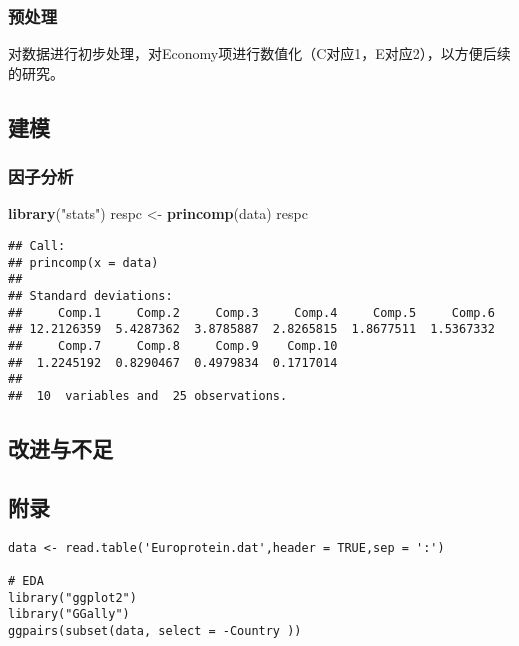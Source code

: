 \documentclass[]{article}
\newenvironment{Shaded}{\begin{snugshade}}{\end{snugshade}}
\newcommand{\KeywordTok}[1]{\textcolor[rgb]{0.13,0.29,0.53}{\textbf{#1}}}
\newcommand{\NormalTok}[1]{#1}
\newcommand{\StringTok}[1]{\textcolor[rgb]{0.31,0.60,0.02}{#1}}
\begin{document}
\subsubsection{预处理}

对数据进行初步处理，对Economy项进行数值化（C对应1，E对应2），以方便后续的研究。

\subsection{建模}

\subsubsection{因子分析}

\begin{Shaded}
\begin{Highlighting}[]
\KeywordTok{library}\NormalTok{(}\StringTok{"stats"}\NormalTok{)}
\NormalTok{respc <-}\StringTok{ }\KeywordTok{princomp}\NormalTok{(data)}
\NormalTok{respc}
\end{Highlighting}
\end{Shaded}

\begin{verbatim}
## Call:
## princomp(x = data)
## 
## Standard deviations:
##     Comp.1     Comp.2     Comp.3     Comp.4     Comp.5     Comp.6 
## 12.2126359  5.4287362  3.8785887  2.8265815  1.8677511  1.5367332 
##     Comp.7     Comp.8     Comp.9    Comp.10 
##  1.2245192  0.8290467  0.4979834  0.1717014 
## 
##  10  variables and  25 observations.
\end{verbatim}

\hypertarget{section}{%
\subsubsection{}\label{section}}

\subsection{改进与不足}

\subsection{附录}

\begin{verbatim}
data <- read.table('Europrotein.dat',header = TRUE,sep = ':')

# EDA
library("ggplot2")
library("GGally")
ggpairs(subset(data, select = -Country ))
\end{verbatim}
\end{document}
